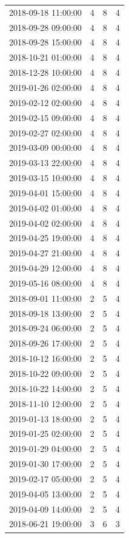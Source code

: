 \begin{tabular}{lrrr}
2018-09-18 11:00:00 & 4 & 8 & 4 \\
2018-09-28 09:00:00 & 4 & 8 & 4 \\
2018-09-28 15:00:00 & 4 & 8 & 4 \\
2018-10-21 01:00:00 & 4 & 8 & 4 \\
2018-12-28 10:00:00 & 4 & 8 & 4 \\
2019-01-26 02:00:00 & 4 & 8 & 4 \\
2019-02-12 02:00:00 & 4 & 8 & 4 \\
2019-02-15 09:00:00 & 4 & 8 & 4 \\
2019-02-27 02:00:00 & 4 & 8 & 4 \\
2019-03-09 00:00:00 & 4 & 8 & 4 \\
2019-03-13 22:00:00 & 4 & 8 & 4 \\
2019-03-15 10:00:00 & 4 & 8 & 4 \\
2019-04-01 15:00:00 & 4 & 8 & 4 \\
2019-04-02 01:00:00 & 4 & 8 & 4 \\
2019-04-02 02:00:00 & 4 & 8 & 4 \\
2019-04-25 19:00:00 & 4 & 8 & 4 \\
2019-04-27 21:00:00 & 4 & 8 & 4 \\
2019-04-29 12:00:00 & 4 & 8 & 4 \\
2019-05-16 08:00:00 & 4 & 8 & 4 \\
2018-09-01 11:00:00 & 2 & 5 & 4 \\
2018-09-18 13:00:00 & 2 & 5 & 4 \\
2018-09-24 06:00:00 & 2 & 5 & 4 \\
2018-09-26 17:00:00 & 2 & 5 & 4 \\
2018-10-12 16:00:00 & 2 & 5 & 4 \\
2018-10-22 09:00:00 & 2 & 5 & 4 \\
2018-10-22 14:00:00 & 2 & 5 & 4 \\
2018-11-10 12:00:00 & 2 & 5 & 4 \\
2019-01-13 18:00:00 & 2 & 5 & 4 \\
2019-01-25 02:00:00 & 2 & 5 & 4 \\
2019-01-29 04:00:00 & 2 & 5 & 4 \\
2019-01-30 17:00:00 & 2 & 5 & 4 \\
2019-02-17 05:00:00 & 2 & 5 & 4 \\
2019-04-05 13:00:00 & 2 & 5 & 4 \\
2019-04-09 14:00:00 & 2 & 5 & 4 \\
2018-06-21 19:00:00 & 3 & 6 & 3 \\

\end{tabular}
